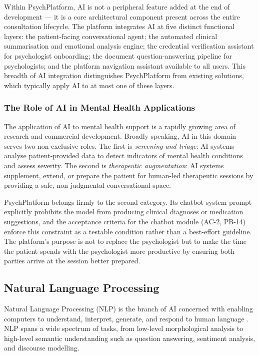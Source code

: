 \documentclass[a4paper,12pt]{report}
\begin{document}
Within PsychPlatform, AI is not a peripheral feature added at the end of development --- it is a core architectural component present across the entire consultation lifecycle. The platform integrates AI at five distinct functional layers: the patient-facing conversational agent; the automated clinical summarisation and emotional analysis engine; the credential verification assistant for psychologist onboarding; the document question-answering pipeline for psychologists; and the platform navigation assistant available to all users. This breadth of AI integration distinguishes PsychPlatform from existing solutions, which typically apply AI to at most one of these layers.

\subsubsection{The Role of AI in Mental Health Applications}

The application of AI to mental health support is a rapidly growing area of research and commercial development. Broadly speaking, AI in this domain serves two non-exclusive roles. The first is \emph{screening and triage}: AI systems analyse patient-provided data to detect indicators of mental health conditions and assess severity. The second is \emph{therapeutic augmentation}: AI systems supplement, extend, or prepare the patient for human-led therapeutic sessions by providing a safe, non-judgmental conversational space.

PsychPlatform belongs firmly to the second category. Its chatbot system prompt explicitly prohibits the model from producing clinical diagnoses or medication suggestions, and the acceptance criteria for the chatbot module (AC-2, PB-14) enforce this constraint as a testable condition rather than a best-effort guideline. The platform's purpose is not to replace the psychologist but to make the time the patient spends with the psychologist more productive by ensuring both parties arrive at the session better prepared.

\subsection{Natural Language Processing}
\label{subsec:nlp}

Natural Language Processing (NLP) is the branch of AI concerned with enabling computers to understand, interpret, generate, and respond to human language \cite{JurafskyMartin2023}. NLP spans a wide spectrum of tasks, from low-level morphological analysis to high-level semantic understanding such as question answering, sentiment analysis, and discourse modelling.
\end{document}
